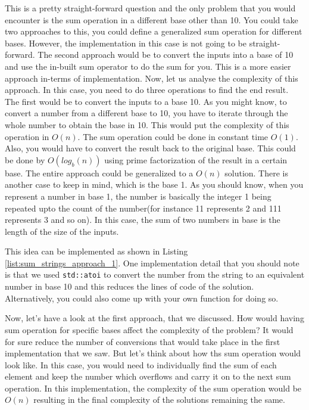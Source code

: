 This is a pretty straight-forward question and the only problem that you would encounter is the sum operation in a different base other than 10. You could take two approaches to this, you could define a generalized sum operation for different bases. However, the implementation in this case is not going to be straight-forward. The second approach would be to convert the inputs into a base of 10 and use the in-built sum operator to do the sum for you. This is a more easier approach in-terms of implementation. Now, let us analyse the complexity of this approach. In this case, you need to do three operations to find the end result. The first would be to convert the inputs to a base 10. As you might know, to convert a number from a different base to 10, you have to iterate through the whole number to obtain the base in 10. This would put the complexity of this operation in ${O(n)}$. The sum operation could be done in constant time ${O(1)}$. Also, you would have to convert the result back to the original base. This could be done by ${O(log_{b}(n))}$ using prime factorization of the result in a certain base. The entire approach could be generalized to a ${O(n)}$ solution. There is another case to keep in mind, which is the base 1. As you should know, when you represent a number in base 1, the number is basically the integer 1 being repeated upto the count of the number(for instance 11 represents 2 and 111 represents 3 and so on). In this case, the sum of two numbers in base is the length of the size of the inputs. 

This idea can be implemented as shown in Listing \ref{list:sum_strings_approach_1}. One implementation detail that you should note is that we used \lstinline[columns=fixed]{std::atoi} to convert the number from the string to an equivalent number in base 10 and this reduces the lines of code of the solution. Alternatively, you could also come up with your own function for doing so.

\begin{minipage}{\linewidth}
	
\end{minipage}

Now, let's have a look at the first approach, that we discussed. How would having sum operation for specific bases affect the complexity of the problem? It would for sure reduce the number of conversions that would take place in the first implementation that we saw. But let's think about how ths sum operation would look like. In this case, you would need to individually find the sum of each element and keep the number which overflows and carry it on to the next sum operation. In this implementation, the complexity of the sum operation would be ${O(n)}$ resulting in the final complexity of the solutions remaining the same.